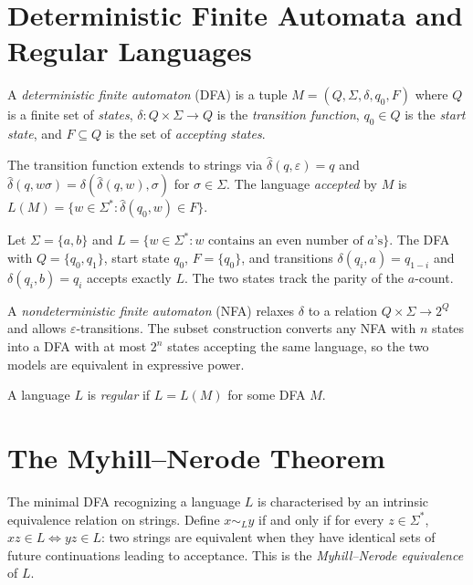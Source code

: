\section{Deterministic Finite Automata and Regular Languages}

\begin{definition}
A \emph{deterministic finite automaton} (DFA) is a tuple $M = (Q, \Sigma, \delta, q_0, F)$ where $Q$ is a finite set of \emph{states}, $\delta : Q \times \Sigma \to Q$ is the \emph{transition function}, $q_0 \in Q$ is the \emph{start state}, and $F \subseteq Q$ is the set of \emph{accepting states}.
\end{definition}

The transition function extends to strings via $\hat{\delta}(q, \varepsilon) = q$ and $\hat{\delta}(q, w\sigma) = \delta(\hat{\delta}(q, w), \sigma)$ for $\sigma \in \Sigma$. The language \emph{accepted} by $M$ is $L(M) = \{w \in \Sigma^* : \hat{\delta}(q_0, w) \in F\}$.

\begin{example}
Let $\Sigma = \{a, b\}$ and $L = \{w \in \Sigma^* : w \text{ contains an even number of } a\text{'s}\}$. The DFA with $Q = \{q_0, q_1\}$, start state $q_0$, $F = \{q_0\}$, and transitions $\delta(q_i, a) = q_{1-i}$ and $\delta(q_i, b) = q_i$ accepts exactly $L$. The two states track the parity of the $a$-count.
\end{example}

A \emph{nondeterministic finite automaton} (NFA) relaxes $\delta$ to a relation $Q \times \Sigma \to 2^Q$ and allows $\varepsilon$-transitions. The subset construction converts any NFA with $n$ states into a DFA with at most $2^n$ states accepting the same language, so the two models are equivalent in expressive power.

\begin{definition}
A language $L$ is \emph{regular} if $L = L(M)$ for some DFA $M$.
\end{definition}

\section{The Myhill--Nerode Theorem}

The minimal DFA recognizing a language $L$ is characterised by an intrinsic equivalence relation on strings. Define $x \sim_L y$ if and only if for every $z \in \Sigma^*$, $xz \in L \iff yz \in L$: two strings are equivalent when they have identical sets of future continuations leading to acceptance. This is the \emph{Myhill--Nerode equivalence} of $L$.

